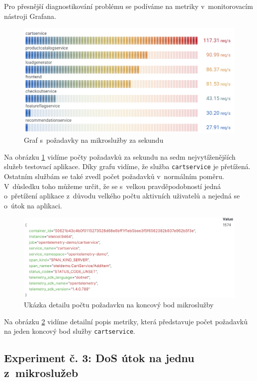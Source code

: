Pro přesnější diagnostikování problému se podíváme na metriky v~monitorovacím nástroji Grafana. 

\begin{figure}[H]
  \centering
  \includegraphics[width=13cm]{obrazky-figures/grafana_request.png}
  \caption{Graf s~požadavky na mikroslužby za sekundu}
  \label{fig:grafanaRequest}
\end{figure}

Na obrázku \ref{fig:grafanaRequest} vidíme počty požadavků za sekundu na sedm nejvytíženějších služeb testovací aplikace. Díky grafu vidíme, že služba \texttt{cartservice} je přetížená. Ostatním službám se také zvedl počet požadavků v~normálním poměru. V~důsledku toho můžeme určit, že se s~velkou pravděpodobností jedná o~přetížení aplikace z~důvodu velkého počtu aktivních uživatelů a nejedná se o~útok na aplikaci.

\begin{figure}[H]
  \centering
  \includegraphics[width=13cm]{obrazky-figures/detail.png}
  \caption{Ukázka detailu počtu požadavku na koncový bod mikroslužby}
  \label{fig:grafanaRequestDetail}
\end{figure}

Na obrázku \ref{fig:grafanaRequestDetail} vidíme detailní popis metriky, která představuje počet požadavků na jeden koncový bod služby \texttt{cartservice}.
 

\subsection{Experiment č. 3: DoS útok na jednu z~mikroslužeb}

